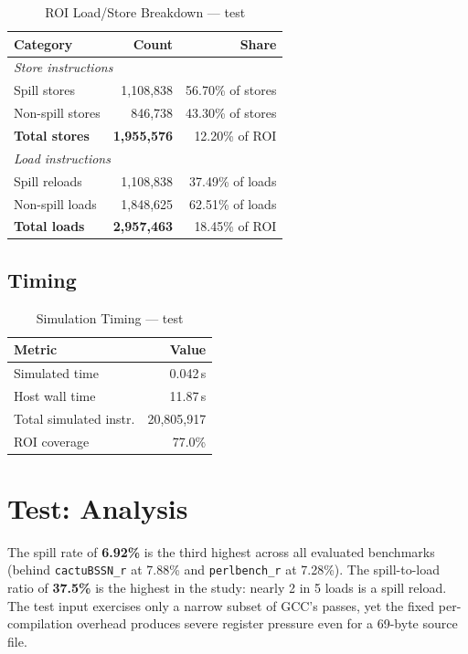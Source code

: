 \documentclass[conference]{IEEEtran}
\begin{document}
\begin{table}[H]
\centering
\caption{ROI Load/Store Breakdown --- test}
\label{tab:test_lsbreakdown}
\begin{tabular}{lrr}
\toprule
\textbf{Category} & \textbf{Count} & \textbf{Share} \\
\midrule
\multicolumn{3}{l}{\textit{Store instructions}} \\
\quad Spill stores   & 1,108,838 & 56.70\% of stores \\
\quad Non-spill stores & 846,738 & 43.30\% of stores \\
\quad \textbf{Total stores} & \textbf{1,955,576} & 12.20\% of ROI \\
\midrule
\multicolumn{3}{l}{\textit{Load instructions}} \\
\quad Spill reloads    & 1,108,838 & 37.49\% of loads \\
\quad Non-spill loads  & 1,848,625 & 62.51\% of loads \\
\quad \textbf{Total loads} & \textbf{2,957,463} & 18.45\% of ROI \\
\bottomrule
\end{tabular}
\end{table}

\subsection{Timing}

\begin{table}[H]
\centering
\caption{Simulation Timing --- test}
\label{tab:test_timing}
\begin{tabular}{lr}
\toprule
\textbf{Metric} & \textbf{Value} \\
\midrule
Simulated time           & 0.042\,s \\
Host wall time           & 11.87\,s \\
Total simulated instr.   & 20,805,917 \\
ROI coverage             & 77.0\% \\
\bottomrule
\end{tabular}
\end{table}

\section{Test: Analysis}

The spill rate of \textbf{6.92\%} is the third highest across all
evaluated benchmarks (behind \texttt{cactuBSSN\_r} at 7.88\% and
\texttt{perlbench\_r} at 7.28\%). The spill-to-load ratio of
\textbf{37.5\%} is the highest in the study: nearly 2 in 5 loads
is a spill reload. The test input exercises only a narrow subset of
GCC's passes, yet the fixed per-compilation overhead produces severe
register pressure even for a 69-byte source file.
\end{document}
